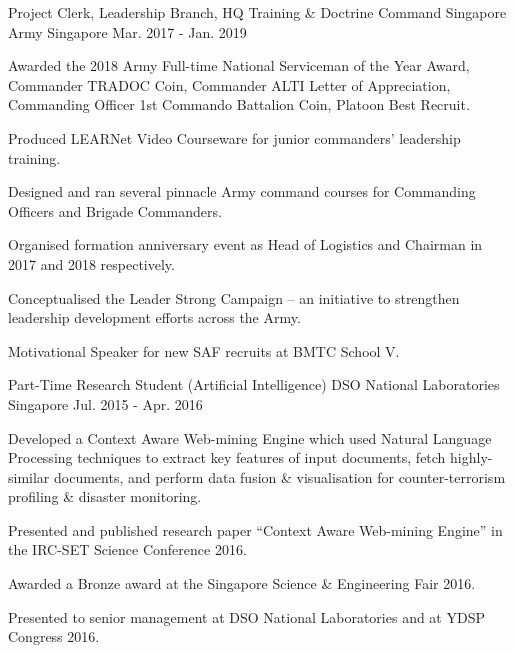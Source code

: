 

\begin{cventries}

  \cventry
    {Project Clerk, Leadership Branch, HQ Training \& Doctrine Command} %
    {Singapore Army} %
    {Singapore} %
    {Mar. 2017 - Jan. 2019} %
    {
      \begin{cvitems} %
        \item {Awarded the 2018 Army Full-time National Serviceman of the Year Award, Commander TRADOC Coin, Commander ALTI Letter of Appreciation, Commanding Officer 1st Commando Battalion Coin, Platoon Best Recruit.}
        \item {Produced LEARNet Video Courseware for junior commanders' leadership training.}
        \item {Designed and ran several pinnacle Army command courses for Commanding Officers and Brigade Commanders.}
        \item {Organised formation anniversary event as Head of Logistics and Chairman in 2017 and 2018 respectively.}
        \item {Conceptualised the Leader Strong Campaign – an initiative to strengthen leadership development efforts across the Army.}
        \item {Motivational Speaker for new SAF recruits at BMTC School V.}
      \end{cvitems}
    }

  \cventry
    {Part-Time Research Student (Artificial Intelligence)} %
    {DSO National Laboratories} %
    {Singapore} %
    {Jul. 2015 - Apr. 2016} %
    {
      \begin{cvitems} %
        \item {Developed a Context Aware Web-mining Engine which used Natural Language Processing techniques to extract key features of input documents, fetch highly-similar documents, and perform data fusion \& visualisation for counter-terrorism profiling \& disaster monitoring.}
        \item {Presented and published research paper “Context Aware Web-mining Engine” in the IRC-SET Science Conference 2016.}
        \item {Awarded a Bronze award at the Singapore Science \& Engineering Fair 2016.}
        \item {Presented to senior management at DSO National Laboratories and at YDSP Congress 2016.}
      \end{cvitems}
    }


\end{cventries}
